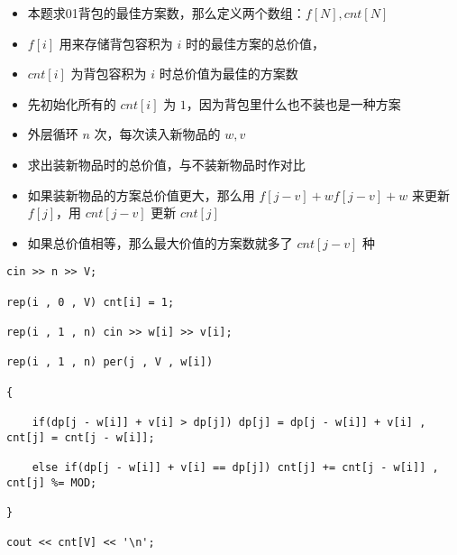 \documentclass[E:/GsjzTle/main/main.tex]{subfiles}
\begin{document}
\begin{itemize}
\item
  本题求01背包的最佳方案数，那么定义两个数组：\(f[N],cnt[N]\)
\item
  \(f[i]\) 用来存储背包容积为 \(i\) 时的最佳方案的总价值，
\item
  \(cnt[i]\) 为背包容积为 \(i\) 时总价值为最佳的方案数
\item
  先初始化所有的 \(cnt[i]\) 为 \(1\)，因为背包里什么也不装也是一种方案
\item
  外层循环 \(n\) 次，每次读入新物品的 \(w,v\)
\item
  求出装新物品时的总价值，与不装新物品时作对比
\item
  如果装新物品的方案总价值更大，那么用 \(f[j−v]+wf[j−v]+w\) 来更新
  \(f[j]\)，用 \(cnt[j−v]\) 更新 \(cnt[j]\)
\item
  如果总价值相等，那么最大价值的方案数就多了 \(cnt[j−v]\) 种
\end{itemize}

\begin{lstlisting}
cin >> n >> V;

rep(i , 0 , V) cnt[i] = 1;

rep(i , 1 , n) cin >> w[i] >> v[i];

rep(i , 1 , n) per(j , V , w[i])

{

	if(dp[j - w[i]] + v[i] > dp[j]) dp[j] = dp[j - w[i]] + v[i] , cnt[j] = cnt[j - w[i]];

	else if(dp[j - w[i]] + v[i] == dp[j]) cnt[j] += cnt[j - w[i]] , cnt[j] %= MOD;

}

cout << cnt[V] << '\n';
\end{lstlisting}
\end{document}
